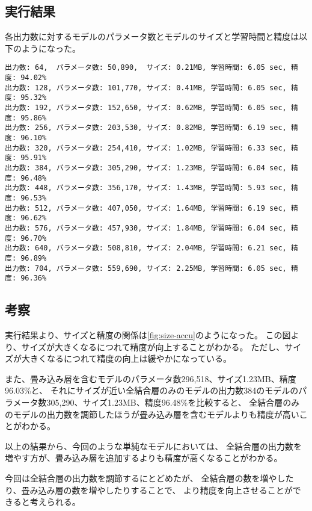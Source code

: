 \documentclass{ltjsarticle}
\begin{document}
    \subsection{実行結果}
        各出力数に対するモデルのパラメータ数とモデルのサイズと学習時間と精度は以下のようになった。
        \begin{lstlisting}
出力数: 64,  パラメータ数: 50,890,  サイズ: 0.21MB, 学習時間: 6.05 sec, 精度: 94.02%
出力数: 128, パラメータ数: 101,770, サイズ: 0.41MB, 学習時間: 6.05 sec, 精度: 95.32%
出力数: 192, パラメータ数: 152,650, サイズ: 0.62MB, 学習時間: 6.05 sec, 精度: 95.86%
出力数: 256, パラメータ数: 203,530, サイズ: 0.82MB, 学習時間: 6.19 sec, 精度: 96.10%
出力数: 320, パラメータ数: 254,410, サイズ: 1.02MB, 学習時間: 6.33 sec, 精度: 95.91%
出力数: 384, パラメータ数: 305,290, サイズ: 1.23MB, 学習時間: 6.04 sec, 精度: 96.48%
出力数: 448, パラメータ数: 356,170, サイズ: 1.43MB, 学習時間: 5.93 sec, 精度: 96.53%
出力数: 512, パラメータ数: 407,050, サイズ: 1.64MB, 学習時間: 6.19 sec, 精度: 96.62%
出力数: 576, パラメータ数: 457,930, サイズ: 1.84MB, 学習時間: 6.04 sec, 精度: 96.70%
出力数: 640, パラメータ数: 508,810, サイズ: 2.04MB, 学習時間: 6.21 sec, 精度: 96.89%
出力数: 704, パラメータ数: 559,690, サイズ: 2.25MB, 学習時間: 6.05 sec, 精度: 96.36%
        \end{lstlisting}

    \subsection{考察}
        実行結果より、サイズと精度の関係は\ref{fig:size-accu}のようになった。
        この図より、サイズが大きくなるにつれて精度が向上することがわかる。
        ただし、サイズが大きくなるにつれて精度の向上は緩やかになっている。

        また、畳み込み層を含むモデルのパラメータ数296,518、サイズ1.23MB、精度96.03\%と、
        それにサイズが近い全結合層のみのモデルの出力数384のモデルのパラメータ数305,290、サイズ1.23MB、精度96.48\%を比較すると、
        全結合層のみのモデルの出力数を調節したほうが畳み込み層を含むモデルよりも精度が高いことがわかる。

        以上の結果から、今回のような単純なモデルにおいては、
        全結合層の出力数を増やす方が、畳み込み層を追加するよりも精度が高くなることがわかる。

        今回は全結合層の出力数を調節するにとどめたが、
        全結合層の数を増やしたり、畳み込み層の数を増やしたりすることで、
        より精度を向上させることができると考えられる。
\end{document}
